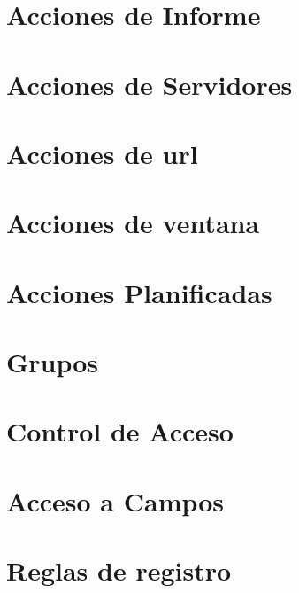 \documentclass[letterpaper,10pt,spanish]{sphinxmanual}
\begin{document}
\section{Acciones de Informe}
\label{\detokenize{tecnico/actions-y-menus:acciones-de-informe}}

\section{Acciones de Servidores}
\label{\detokenize{tecnico/actions-y-menus:acciones-de-servidores}}

\section{Acciones de url}
\label{\detokenize{tecnico/actions-y-menus:acciones-de-url}}

\section{Acciones de ventana}
\label{\detokenize{tecnico/actions-y-menus:acciones-de-ventana}}

\section{Acciones Planificadas}
\label{\detokenize{tecnico/actions-y-menus:acciones-planificadas}}


\section{Grupos}
\label{\detokenize{tecnico/seguridad:grupos}}\label{\detokenize{tecnico/seguridad:seguridad}}\label{\detokenize{tecnico/seguridad::doc}}

\section{Control de Acceso}
\label{\detokenize{tecnico/seguridad:control-de-acceso}}

\section{Acceso a Campos}
\label{\detokenize{tecnico/seguridad:acceso-a-campos}}

\section{Reglas de registro}
\label{\detokenize{tecnico/seguridad:reglas-de-registro}}
\end{document}
